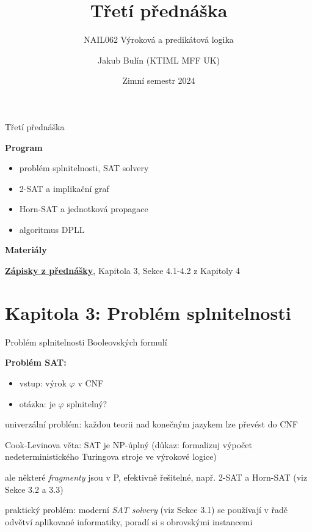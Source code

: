 \documentclass{beamer}
\title{Třetí přednáška}
\subtitle{NAIL062 Výroková a predikátová logika}
\author{Jakub Bulín (KTIML MFF UK)}
\date{Zimní semestr 2024}
\begin{document}
\maketitle


\begin{frame}{Třetí přednáška}

    \textbf{Program}
        \begin{itemize}
            \item problém splnitelnosti, SAT solvery
            \item 2-SAT a implikační graf
            \item Horn-SAT a jednotková propagace
            \item algoritmus DPLL
        \end{itemize}

    \textbf{Materiály}

        \href{https://github.com/jbulin-mff-uk/nail062/raw/main/lecture/lecture-notes/lecture-notes.pdf}{\alert{\textbf{Zápisky z přednášky}}}, Kapitola 3, Sekce 4.1-4.2 z Kapitoly 4

\end{frame}


\section{\sc Kapitola 3: Problém splnitelnosti}


\begin{frame}{Problém splnitelnosti Booleovských formulí}
   
    \textbf{Problém SAT:}
    \begin{itemize}
        \item vstup: výrok $\varphi$ v CNF
        \item otázka: je $\varphi$ splnitelný? 
    \end{itemize}

    \alert{univerzální problém}: každou teorii nad konečným jazykem lze převést do CNF

    \alert{Cook-Levinova věta}: SAT je NP-úplný (důkaz: formalizuj výpočet nedeterministického Turingova stroje ve výrokové logice)

    ale některé \emph{fragmenty} jsou v P, efektivně řešitelné, např. 2-SAT a Horn-SAT (viz Sekce 3.2 a 3.3)

    \alert{praktický problém}: moderní \emph{SAT solvery} (viz Sekce 3.1) se používají v řadě odvětví aplikované informatiky, poradí si s obrovskými instancemi
    
\end{frame}
\end{document}
